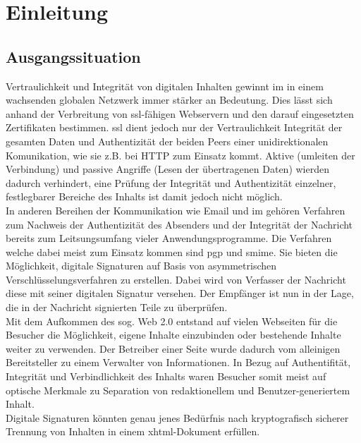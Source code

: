 \chapter{Einleitung}
%
\label{chp:einleitung}%



\section{Ausgangssituation}
%
\label{sec:einl:ausgangssituation}%

Vertraulichkeit und Integrität von digitalen Inhalten gewinnt im in einem wachsenden globalen Netzwerk immer stärker an Bedeutung. Dies lässt sich anhand der Verbreitung von \gls{ssl}-fähigen Webservern und den darauf eingesetzten Zertifikaten bestimmen. \gls{ssl} dient jedoch nur der Vertraulichkeit Integrität der gesamten Daten und Authentizität der beiden Peers einer unidirektionalen Komunikation, wie sie z.B. bei HTTP zum Einsatz kommt. Aktive (umleiten der Verbindung) und passive Angriffe (Lesen der übertragenen Daten) wierden dadurch verhindert, eine Prüfung der Integrität und Authentizität einzelner, festlegbarer Bereiche des Inhalts ist damit jedoch nicht möglich. \\
In anderen Bereihen der Kommunikation wie Email und \gls{im} gehören Verfahren zum Nachweis der Authentizität des Absenders und der Integrität der Nachricht bereits zum Leitsungsumfang vieler Anwendungsprogramme. Die Verfahren welche dabei meist zum Einsatz kommen sind \gls{pgp} und \gls{smime}. Sie bieten die Möglichkeit, digitale Signaturen auf Basis von asymmetrischen Verschlüsselungsverfahren zu erstellen. Dabei wird von Verfasser der Nachricht diese mit seiner digitalen Signatur versehen. Der Empfänger ist nun in der Lage, die in der Nachricht signierten Teile zu überprüfen. \\
Mit dem Aufkommen des sog. Web 2.0 entstand auf vielen Webseiten für die Besucher die Möglichkeit, eigene Inhalte einzubinden oder bestehende Inhalte weiter zu verwenden. Der Betreiber einer Seite wurde dadurch vom alleinigen Bereitsteller zu einem Verwalter von Informationen. In Bezug auf Authentifität, Integrität und Verbindlichkeit des Inhalts waren Besucher somit meist auf optische Merkmale zu Separation von redaktionellem und Benutzer-generiertem Inhalt. \\
Digitale Signaturen könnten genau jenes Bedürfnis nach kryptografisch sicherer Trennung von Inhalten in einem \gls{xhtml}-Dokument erfüllen.

